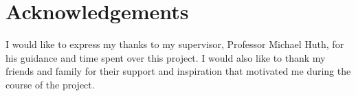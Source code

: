 \section*{Acknowledgements} \thispagestyle{plain}

I would like to express my thanks to my supervisor, Professor Michael Huth, for his guidance and time spent over this project. I would also like to thank my friends and family for their support and inspiration that motivated me during the course of the project.

